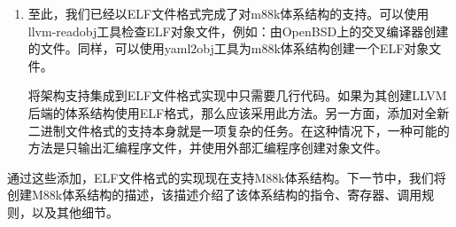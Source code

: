 \begin{enumerate}
\item 至此，我们已经以ELF文件格式完成了对m88k体系结构的支持。可以使用llvm-readobj工具检查ELF对象文件，例如：由OpenBSD上的交叉编译器创建的文件。同样，可以使用yaml2obj工具为m88k体系结构创建一个ELF对象文件。

\begin{tcolorbox}[colback=blue!5!white,colframe=blue!75!black, title=是否必须添加对对象文件格式的支持?]
	
将架构支持集成到ELF文件格式实现中只需要几行代码。如果为其创建LLVM后端的体系结构使用ELF格式，那么应该采用此方法。另一方面，添加对全新二进制文件格式的支持本身就是一项复杂的任务。在这种情况下，一种可能的方法是只输出汇编程序文件，并使用外部汇编程序创建对象文件。
\end{tcolorbox}

\end{enumerate}

通过这些添加，ELF文件格式的实现现在支持M88k体系结构。下一节中，我们将创建M88k体系结构的描述，该描述介绍了该体系结构的指令、寄存器、调用规则，以及其他细节。\par























































